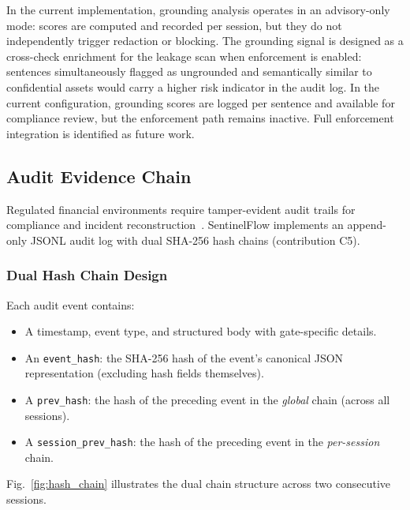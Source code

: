 \documentclass[journal]{IEEEtran}
\begin{document}
In the current implementation, grounding analysis operates in an advisory-only mode: scores are computed and recorded per session, but they do not independently trigger redaction or blocking. The grounding signal is designed as a cross-check enrichment for the leakage scan when enforcement is enabled: sentences simultaneously flagged as ungrounded and semantically similar to confidential assets would carry a higher risk indicator in the audit log. In the current configuration, grounding scores are logged per sentence and available for compliance review, but the enforcement path remains inactive. Full enforcement integration is identified as future work.

\subsection{Audit Evidence Chain}
\label{Sect:Audit_Chain}

Regulated financial environments require tamper-evident audit trails for compliance and incident reconstruction~\cite{nist_ai_rmf}. SentinelFlow implements an append-only JSONL audit log with dual SHA-256 hash chains (contribution C5).

\subsubsection{Dual Hash Chain Design}

Each audit event contains:
\begin{itemize}
    \item A timestamp, event type, and structured body with gate-specific details.
    \item An \texttt{event\_hash}: the SHA-256 hash of the event's canonical JSON representation (excluding hash fields themselves).
    \item A \texttt{prev\_hash}: the hash of the preceding event in the \textit{global} chain (across all sessions).
    \item A \texttt{session\_prev\_hash}: the hash of the preceding event in the \textit{per-session} chain.
\end{itemize}

Fig.~\ref{fig:hash_chain} illustrates the dual chain structure across two consecutive sessions.
\end{document}
